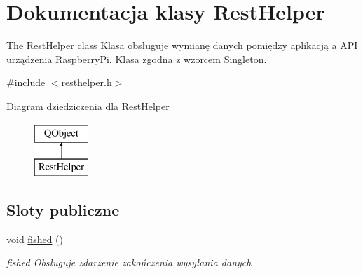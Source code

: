 \hypertarget{class_rest_helper}{}\section{Dokumentacja klasy Rest\+Helper}
\label{class_rest_helper}


The \mbox{\hyperlink{class_rest_helper}{Rest\+Helper}} class Klasa obsługuje wymianę danych pomiędzy aplikacją a A\+PI urządzenia Raspberry\+Pi. Klasa zgodna z wzorcem Singleton.  




{\ttfamily \#include $<$resthelper.\+h$>$}

Diagram dziedziczenia dla Rest\+Helper\begin{figure}[H]
\begin{center}
\leavevmode
\includegraphics[height=2.000000cm]{class_rest_helper}
\end{center}
\end{figure}
\subsection*{Sloty publiczne}
\begin{DoxyCompactItemize}
\item 
\mbox{\label{class_rest_helper_ae4960f651712c6ed66b032b3515b9f7b}} 
void \mbox{\hyperlink{class_rest_helper_ae4960f651712c6ed66b032b3515b9f7b}{fished}} ()
\begin{DoxyCompactList}\small\item\em fished Obsługuje zdarzenie zakończenia wysyłania danych \end{DoxyCompactList}\end{DoxyCompactItemize}

